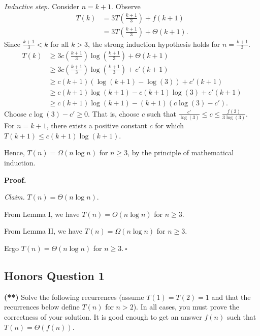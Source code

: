 \begin{enumerate}
\textit{Inductive step. }Consider $n=k+1$. Observe
\begin{align*}
T(k)&=3T\left(\frac{k+1}{3}\right)+f(k+1)\\
&=3T\left(\frac{k+1}{3}\right)+\Theta(k+1).
\end{align*}
Since $\frac{k+1}{3}<k$ for all $k>3$, the strong induction hypothesis holds for $n=\frac{k+1}{3}$.
\begin{align*}
T(k)&\geq 3c\left(\frac{k+1}{3}\right)\log\left(\frac{k+1}{3}\right)+\Theta(k+1)\\
&\geq 3c\left(\frac{k+1}{3}\right)\log\left(\frac{k+1}{3}\right)+c'(k+1)\\
&\geq c(k+1)(\log(k+1)-\log(3))+c'(k+1)\\
&\geq c(k+1)\log(k+1)-c(k+1)\log(3)+c'(k+1)\\
&\geq c(k+1)\log(k+1)-(k+1)(c\log(3)-c').
\end{align*}
Choose $c\log(3)-c'\geq 0$. That is, choose $c$ such that $\frac{c'}{\log(3)}\leq c\leq\frac{f(3)}{3\log(3)}$. For $n=k+1$, there exists a positive constant $c$ for which $T(k+1)\leq c(k+1)\log(k+1)$. 

Hence, $T(n)=\Omega(n\log n)$ for $n\geq 3$, by the principle of mathematical induction.

\textbf{Proof. }

\textit{Claim. }$T(n)=\Theta(n\log n)$.

From Lemma I, we have $T(n)=O(n\log n)$ for $n\geq 3$.

From Lemma II, we have $T(n)=\Omega(n\log n)$ for $n\geq 3$.

Ergo $T(n)=\Theta(n\log n)$ for $n\geq 3$.$~\square$
\end{enumerate}
\newpage

\subsection*{Honors Question 1}
{\bf (**)}
Solve the following recurrences (assume $T(1)=T(2)=1$ and that the recurrences below define $T(n)$ for $n>2$). In all cases, you must prove the correctness of your solution. It is good enough to get an answer $f(n)$ such that $T(n)=\Theta(f(n))$.

